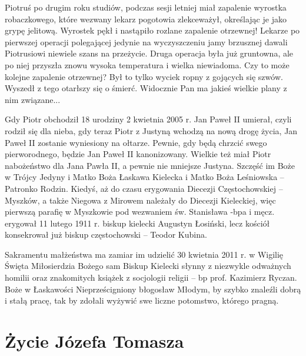 Piotruś po drugim roku studiów, podczas sesji letniej miał zapalenie wyrostka robaczkowego, które wezwany lekarz pogotowia zlekceważył, określając je jako grypę jelitową. Wyrostek pękł i nastąpiło rozlane zapalenie otrzewnej! Lekarze po pierwszej operacji polegającej jedynie na wyczyszczeniu jamy brzusznej dawali Piotrusiowi niewiele szans na przeżycie. Druga operacja była już gruntowna, ale po niej przyszła znowu wysoka temperatura i wielka niewiadoma. Czy to może kolejne zapalenie otrzewnej? Był to tylko wyciek ropny z gojących się szwów. Wyszedł z tego otarłszy się o śmierć. Widocznie Pan ma jakieś wielkie plany z nim związane...

Gdy Piotr obchodził 18 urodziny 2 kwietnia 2005 r. Jan Paweł II umierał, czyli rodził się dla nieba, gdy teraz Piotr z Justyną wchodzą na nową drogę życia, Jan Paweł II zostanie wyniesiony na ołtarze. Pewnie, gdy będą chrzcić  swego pierworodnego, będzie Jan Paweł II kanonizowany. Wielkie też miał Piotr nabożeństwo dla Jana Pawła II, a pewnie nie mniejsze Justyna. Szczęść im Boże w Trójcy Jedyny i Matko Boża Łaskawa Kielecka i Matko Boża Leśniowska – Patronko Rodzin. Kiedyś, aż do czasu erygowania Diecezji Częstochowskiej – Myszków, a także Niegowa z Mirowem należały do Diecezji Kieleckiej, więc pierwszą parafię w Myszkowie pod wezwaniem św. Stanisława -bpa i męcz. erygował 11 lutego 1911 r. biskup kielecki Augustyn Łosiński, lecz kościół konsekrował już biskup częstochowski – Teodor Kubina.

Sakramentu małżeństwa ma zamiar im udzielić 30 kwietnia 2011 r. w Wigilię Święta Miłosierdzia Bożego sam Biskup Kielecki słynny z niezwykle odważnych homilii oraz znakomitych książek z socjologii religii – bp prof. Kazimierz Ryczan. Boże w Łaskawości Nieprześcigniony błogosław Młodym, by szybko znaleźli dobrą i stałą pracę, tak by zdołali wyżywić swe liczne potomstwo, którego pragną.













\clearpage
\section{Życie Józefa Tomasza}

